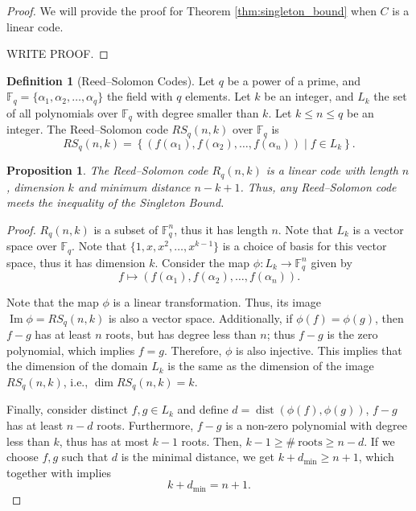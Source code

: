 \documentclass[11pt]{amsart}
\newtheorem{prop}[thm]{Proposition}
\theoremstyle{definition}
\newtheorem{defn}[thm]{Definition}
\theoremstyle{example}
\theoremstyle{remark}
\numberwithin{equation}{section}
\DeclareMathOperator{\dist}{dist}
\DeclareMathOperator{\Ima}{Im}
\DeclareMathOperator{\dimension}{dim}
\begin{document}
\begin{proof}
	We will provide the proof for Theorem \ref{thm:singleton_bound} when $C$ is a linear code.
	
	WRITE PROOF.
\end{proof}

\begin{defn}[Reed--Solomon Codes]\label{defn:rs_codes}
	Let $q$ be a power of a prime, and $\mathbb{F}_q = \{\alpha_1, \alpha_2, \dots, \alpha_q\}$ the field with $q$ elements. Let $k$ be an integer, and ${L}_k$ the set of all polynomials over $\mathbb{F}_q$ with degree smaller than $k$. Let $k \le n \le q$ be an integer. The Reed--Solomon code $RS_q(n, k)$ over $\mathbb{F}_q$ is 
	\begin{equation}
		RS_q(n, k) = \left\{\left(f(\alpha_1), f(\alpha_2), \dots, f(\alpha_n)\right) \mid f \in {L}_k\right\}.
	\end{equation}
\end{defn}

\begin{prop}
	The Reed--Solomon code $R_q(n, k)$ is a linear code with length $n$, dimension $k$ and minimum distance $n - k + 1$.
	Thus, any Reed--Solomon code meets the inequality of the Singleton Bound.
\end{prop}

\begin{proof}
	$R_q(n, k)$ is a subset of $\mathbb{F}_q^n$, thus it has length $n$.  
	Note that $ L_k$ is a vector space over $\mathbb{F}_q$. Note that $\{1, x, x^2, \dots, x^{k-1}\}$ is a choice of basis for this vector space, thus it has dimension $k$. Consider the map $\phi:  L_k \to \mathbb{F}_q^n$ given by 
	\begin{equation}
		f \mapsto (f(\alpha_1), f(\alpha_2), \dots, f(\alpha_n)).
	\end{equation}

	Note that the map $\phi$ is a linear transformation. Thus, its image $\Ima \phi = RS_q(n, k)$ is also a vector space.  
	Additionally, if $\phi(f) = \phi(g)$, then $f - g$ has at least $n$ roots, but has degree less than $n$; thus $f - g$ is the zero polynomial, which implies $f = g$. Therefore, $\phi$ is also injective. This implies that the dimension of the domain $ L_k$ is the same as the dimension of the image $RS_q(n, k)$, i.e.,  $\dimension RS_q(n, k) = k$.
	
	Finally, consider distinct $f, g \in  L_k$ and define $d = \dist(\phi(f), \phi(g))$, $f - g$ has at least $n - d$ roots. Furthermore, $f - g$ is a non-zero polynomial with degree less than $k$, thus has at most $k - 1$ roots. Then,  $ k - 1 \ge \#\ \text{roots} \ge n - d$.
	If we choose $f, g$ such that $d$ is the minimal distance, we get $k + d_{\mathrm{min}} \ge n + 1$, which together with  implies 
	\begin{equation}
		k + d_\text{min} = n + 1.
	\end{equation}

\end{proof}
\end{document}

